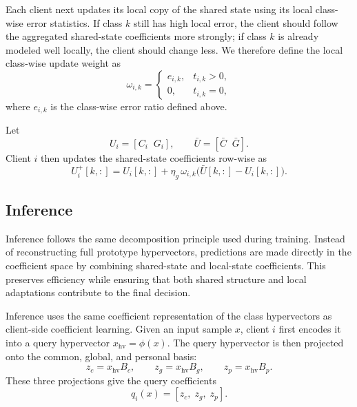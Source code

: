 \documentclass[lettersize,journal]{IEEEtran}
\newcommand{\rev}[1]{#1}
\begin{document}
Each client next updates its \rev{local copy of the shared state} using its local class-wise error statistics.
If class $k$ still has high local error, the client should follow the aggregated \rev{shared-state coefficients} more strongly; if class $k$ is already modeled well locally, the client should change less.
We therefore define the local class-wise update weight as
\begin{equation}
\label{eq:update_weight}
\omega_{i,k}
=
\begin{cases}
e_{i,k}, & t_{i,k}>0,\\
0, & t_{i,k}=0,
\end{cases}
\end{equation}
where $e_{i,k}$ is the class-wise error ratio defined above.

Let
\begin{equation}
U_i = [C_i\;\;G_i],
\qquad
\bar{U} = [\bar C\;\;\bar G].
\end{equation}
Client $i$ then updates the \rev{shared-state coefficients} row-wise as
\begin{equation}
\label{eq:shared_update}
U_i^{+}[k,:]
=
U_i[k,:]
+
\eta_g\,\omega_{i,k}\bigl(\bar{U}[k,:]-U_i[k,:]\bigr).
\end{equation}





\subsection{Inference}
\label{subsec:inference}
Inference follows the same decomposition principle used during training.
Instead of reconstructing full prototype hypervectors, predictions are made directly in the coefficient space by combining \rev{shared-state and local-state coefficients}.
This preserves efficiency while ensuring that both \rev{shared structure and local adaptations} contribute to the final decision.

Inference uses the same coefficient representation of the class hypervectors as \rev{client-side coefficient learning}.
Given an input sample \(x\), client \(i\) first encodes it into a query hypervector \(x_{\mathrm{hv}}=\phi(x)\).
The query hypervector is then projected onto the common, global, and personal basis:
\begin{equation}
\label{eq:infer_proj}
z_c = x_{\mathrm{hv}} B_c, \qquad
z_g = x_{\mathrm{hv}} B_g, \qquad
z_p = x_{\mathrm{hv}} B_p.
\end{equation}
These three projections give the query coefficients
\begin{equation}
\label{eq:infer_query_coord}
q_i(x) = [z_c,\; z_g,\; z_p].
\end{equation}
\end{document}
